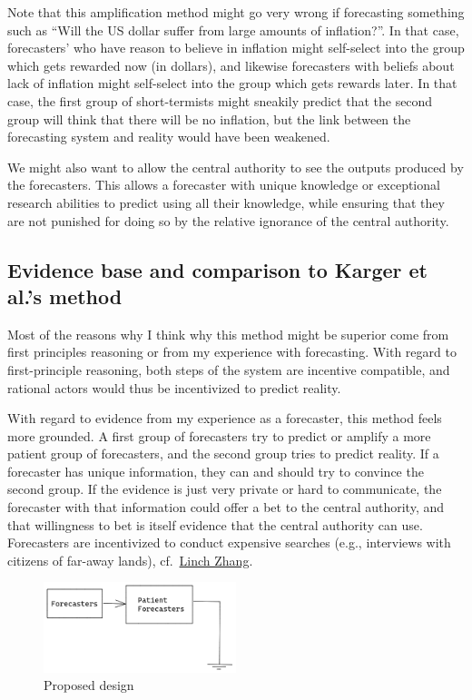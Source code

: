 \documentclass[]{article}
\begin{document}
Note that this amplification method might go very wrong if forecasting
something such as ``Will the US dollar suffer from large amounts of
inflation?''. In that case, forecasters' who have reason to believe in
inflation might self-select into the group which gets rewarded now (in
dollars), and likewise forecasters with beliefs about lack of inflation
might self-select into the group which gets rewards later. In that case,
the first group of short-termists might sneakily predict that the second
group will think that there will be no inflation, but the link between
the forecasting system and reality would have been weakened.

We might also want to allow the central authority to see the outputs
produced by the forecasters. This allows a forecaster with unique
knowledge or exceptional research abilities to predict using all their
knowledge, while ensuring that they are not punished for doing so by the
relative ignorance of the central authority.

\hypertarget{evidence-base-and-comparison-to-karger-et-al.s-method}{%
\subsection{Evidence base and comparison to Karger et al.'s
method}\label{evidence-base-and-comparison-to-karger-et-al.s-method}}

Most of the reasons why I think why this method might be superior come
from first principles reasoning or from my experience with forecasting.
With regard to first-principle reasoning, both steps of the system are
incentive compatible, and rational actors would thus be incentivized to
predict reality.

With regard to evidence from my experience as a forecaster, this method
feels more grounded. A first group of forecasters try to predict or
amplify a more patient group of forecasters, and the second group tries
to predict reality. If a forecaster has unique information, they can and
should try to convince the second group. If the evidence is just very
private or hard to communicate, the forecaster with that information
could offer a bet to the central authority, and that willingness to bet
is itself evidence that the central authority can use. Forecasters are
incentivized to conduct expensive searches (e.g., interviews with
citizens of far-away lands),
cf.~\href{https://twitter.com/LinchZhang/status/1455759586158268417}{Linch
Zhang}.

\begin{figure}
\centering
\includegraphics[width=0.5\textwidth,height=\textheight]{diagrams/amplify-samotsvety-1.png}
\caption{Proposed design}
\end{figure}
\end{document}
